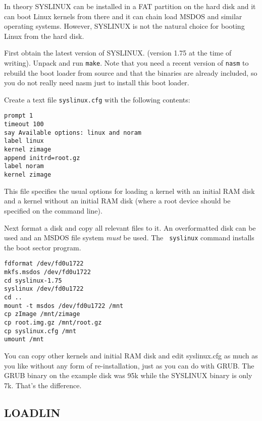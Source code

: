 \documentclass[12pt,a4paper]{article}
\begin{document}
In theory SYSLINUX can be installed in a FAT partition on the hard
disk and it can boot Linux kernels from there and it can chain load MSDOS and
similar operating systems. However, SYSLINUX is not the natural choice
for booting Linux from the hard disk.

First obtain the latest version of SYSLINUX. (version 1.75 at the time
of writing). Unpack and run {\tt make}. Note that you need a recent
version of {\tt nasm} to rebuild the boot loader from source and that
the binaries are already included, so you do not really need nasm just
to install this boot loader.

Create a text file {\tt syslinux.cfg} with the following contents:
\begin{verbatim}
prompt 1
timeout 100
say Available options: linux and noram
label linux
kernel zimage
append initrd=root.gz
label noram
kernel zimage
\end{verbatim}
This file specifies the usual options for loading a kernel with an
initial RAM disk and a kernel without an initial RAM disk (where a
root device should be specified on the command line).

Next format a disk and copy all relevant files to it. An overformatted
disk can be used and an MSDOS file system {\em must} be used. The {\tt
  syslinux} command installs the boot sector program. 
\begin{verbatim}
fdformat /dev/fd0u1722
mkfs.msdos /dev/fd0u1722
cd syslinux-1.75
syslinux /dev/fd0u1722
cd ..
mount -t msdos /dev/fd0u1722 /mnt
cp zImage /mnt/zimage
cp root.img.gz /mnt/root.gz
cp syslinux.cfg /mnt
umount /mnt
\end{verbatim}
You can copy other kernels and initial RAM disk and edit 
syslinux.cfg as much as you like without any form of re-installation,
just as you can do with GRUB.  The GRUB binary on the example disk was
95k while the SYSLINUX binary is only 7k. That's the difference.

\subsection{LOADLIN}
\end{document}
